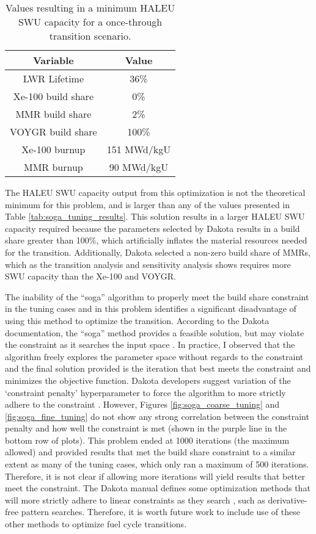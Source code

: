 \begin{table}
    \centering 
    \caption{Values resulting in a minimum \gls{HALEU} \gls{SWU} capacity for 
              a once-through transition scenario.}
    \label{tab:soga_ot_haleu}
    \begin{tabular}{c c}
        \hline
        Variable & Value \\
        \hline
        LWR Lifetime & 36\%\\
        Xe-100 build share & 0\%\\
        MMR build share & 2\%\\
        VOYGR build share & 100\%\\
        Xe-100 burnup & 151 MWd/kgU\\
        MMR burnup & 90 MWd/kgU\\
        \hline
    \end{tabular}
\end{table}

The \gls{HALEU} \gls{SWU} capacity output from this optimization is not the
theoretical minimum for this problem, and is larger than any of the values 
presented in Table \ref{tab:soga_tuning_results}. This solution results in 
a larger \gls{HALEU} \gls{SWU} capacity required because the parameters selected 
by Dakota results in a build share greater than 100\%, which artificially 
inflates the material resources needed for the transition. Additionally, 
Dakota selected a non-zero build share of \glspl{MMR}, which as the transition 
analysis and sensitivity analysis shows requires more \gls{SWU} capacity than 
the Xe-100 and VOYGR. 

The inability of the ``soga'' algorithm to properly meet the build share 
constraint in the tuning cases and in this problem identifies a significant 
disadvantage of using this method to optimize the transition. According to the 
Dakota documentation, the ``soga'' method provides a feasible solution, but
may violate the constraint as it searches the input space \cite{noauthor_dakota_2021}.
In practice, I observed that the algorithm freely explores the parameter space 
without regards to the constraint and the final solution provided is the 
iteration that best meets the constraint and minimizes the objective function.
Dakota developers suggest variation of the `constraint penalty' hyperparameter 
to force the algorithm to more strictly adhere to the constraint 
\cite{noauthor_optimization_2023}. 
However, Figures \ref{fig:soga_coarse_tuning} and \ref{fig:soga_fine_tuning}
do not show any strong correlation between the constraint penalty and how 
well the constraint is met (shown in the purple line in the bottom row of 
plots). This problem ended at 1000 iterations (the maximum allowed) and 
provided results that met the build share constraint to a similar 
extent as many of the tuning cases, which only ran a maximum of 500 iterations. 
Therefore, it is not clear if allowing more iterations will yield results that 
better meet the constraint. The Dakota manual defines some optimization 
methods that will more strictly adhere to linear constraints as they search
\cite{noauthor_dakota_2021}, such as derivative-free pattern searches. 
Therefore, it is worth future work to include use of these other methods to 
optimize fuel cycle transitions. 

